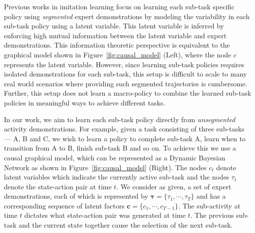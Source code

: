 \documentclass{article} %
\begin{document}
Previous works in imitation learning \citep{li2017infogail, hausman2017multi} focus on learning each sub-task specific policy using \emph{segmented} expert demonstrations by modeling the variability in each sub-task policy using a latent variable. This latent variable is inferred by enforcing high mutual information between the latent variable and expert demonstrations. This information theoretic perspective is equivalent to the graphical model shown in Figure~\ref{fig:causal_model} (Left), where the node $c$ represents the latent variable. However, since learning sub-task policies requires isolated demonstrations for each sub-task, this setup is difficult to scale to many real world scenarios where providing such segmented trajectories is cumbersome. Further, this setup does not learn a macro-policy to combine the learned sub-task policies in meaningful ways to achieve different tasks.

In our work, we aim to learn each sub-task policy directly from \textit{unsegmented} activity demonstrations.
For example, given a task consisting of three sub-tasks --- A, B and C, we wish to learn a policy to complete sub-task A, learn when to transition from A to B, finish sub-task B and so on. To achieve this we use a causal graphical model, which can be represented as a Dynamic Bayesian Network as shown in Figure~\ref{fig:causal_model} (Right). The nodes $c_t$ denote latent variables which indicate the currently active sub-task and the nodes $\tau_t$ denote the state-action pair at time $t$. We consider as given, a set of expert demonstrations, each of which is represented by $\boldsymbol{\tau} = \{\tau_1, \cdots, \tau_T\}$ and has a corresponding sequence of latent factors $\boldsymbol{c} = \{c_1, \cdots, c_{T-1}\} $. The sub-activity at time $t$ dictates what state-action pair was generated at time $t$. The previous sub-task and the current state together cause the selection of the next sub-task.


\end{document}
